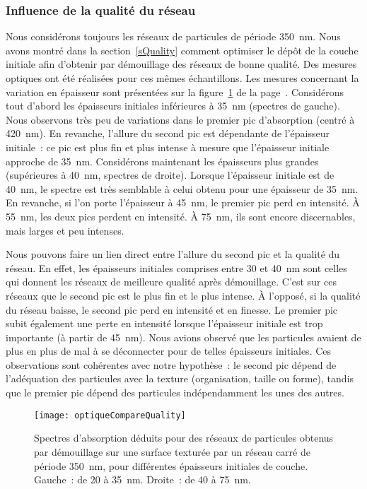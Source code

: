 	\subsubsection{Influence de la qualité du réseau}
Nous considérons toujours les réseaux de particules de période 350~nm. Nous avons montré dans la section~\ref{sQuality} comment optimiser le dépôt de la couche initiale afin d'obtenir par démouillage des réseaux de bonne qualité. Des mesures optiques ont été réalisées pour ces mêmes échantillons. Les mesures concernant la variation en épaisseur sont présentées sur la figure~\ref{optiqueCompareQuality} de la page~\pageref{optiqueCompareQuality}. Considérons tout d'abord les épaisseurs initiales inférieures à 35~nm (spectres de gauche). Nous observons très peu de variations dans le premier pic d'absorption (centré à 420~nm). En revanche, l'allure du second pic est dépendante de l'épaisseur initiale~: ce pic est plus fin et plus intense à mesure que l'épaisseur initiale approche de 35~nm. Considérons maintenant les épaisseurs plus grandes (supérieures à 40~nm, spectres de droite). Lorsque l'épaisseur initiale est de 40~nm, le spectre est très semblable à celui obtenu pour une épaisseur de 35~nm. En revanche, si l'on porte l'épaisseur à 45~nm, le premier pic perd en intensité. À 55~nm, les deux pics perdent en intensité. À 75~nm, ils sont encore discernables, mais larges et peu intenses.\par  
Nous pouvons faire un lien direct entre l'allure du second pic et la qualité du réseau. En effet, les épaisseurs initiales comprises entre 30 et 40~nm sont celles qui donnent les réseaux de meilleure qualité après démouillage. C'est sur ces réseaux que le second pic est le plus fin et le plus intense. À l'opposé, si la qualité du réseau baisse, le second pic perd en intensité et en finesse. Le premier pic subit également une perte en intensité lorsque l'épaisseur initiale est trop importante (à partir de 45~nm). Nous avions observé que les particules avaient de plus en plus de mal à se déconnecter pour de telles épaisseurs initiales. Ces observations sont cohérentes avec notre hypothèse~: le second pic dépend de l'adéquation des particules avec la texture (organisation, taille ou forme), tandis que le premier pic dépend des particules indépendamment les unes des autres.\par 
\begin{figure}[!p]
\centering
\texttt{[image: optiqueCompareQuality]}
\caption{Spectres d'absorption déduits pour des réseaux de particules obtenus par démouillage sur une surface texturée par un réseau carré de période 350~nm, pour différentes épaisseurs initiales de couche. Gauche~: de 20 à 35~nm. Droite~: de 40 à 75~nm.}
\label{optiqueCompareQuality}
\end{figure}
